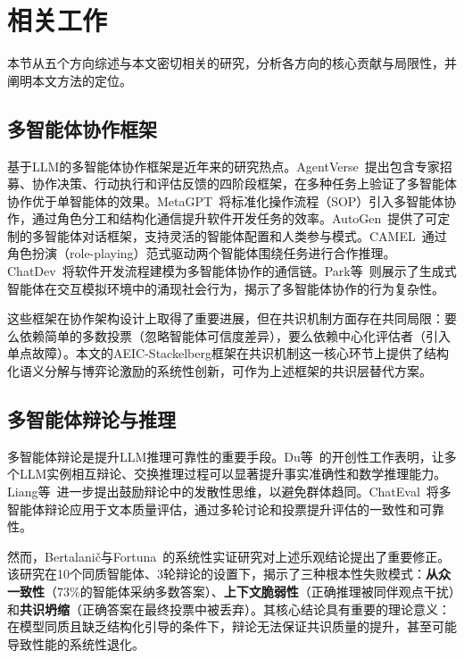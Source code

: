 \documentclass[12pt,a4paper,UTF8,fontset=fandol]{ctexart}
\begin{document}
\section{相关工作}\label{sec:related}

本节从五个方向综述与本文密切相关的研究，分析各方向的核心贡献与局限性，并阐明本文方法的定位。

\subsection{多智能体协作框架}

基于LLM的多智能体协作框架是近年来的研究热点。AgentVerse~\cite{chen2023agentverse}提出包含专家招募、协作决策、行动执行和评估反馈的四阶段框架，在多种任务上验证了多智能体协作优于单智能体的效果。MetaGPT~\cite{hong2023metagpt}将标准化操作流程（SOP）引入多智能体协作，通过角色分工和结构化通信提升软件开发任务的效率。AutoGen~\cite{wu2023autogen}提供了可定制的多智能体对话框架，支持灵活的智能体配置和人类参与模式。CAMEL~\cite{li2023camel}通过角色扮演（role-playing）范式驱动两个智能体围绕任务进行合作推理。ChatDev~\cite{qian2023chatdev}将软件开发流程建模为多智能体协作的通信链。Park等~\cite{park2023generative}则展示了生成式智能体在交互模拟环境中的涌现社会行为，揭示了多智能体协作的行为复杂性。

这些框架在协作架构设计上取得了重要进展，但在共识机制方面存在共同局限：要么依赖简单的多数投票（忽略智能体可信度差异），要么依赖中心化评估者（引入单点故障）。本文的AEIC-Stackelberg框架在共识机制这一核心环节上提供了结构化语义分解与博弈论激励的系统性创新，可作为上述框架的共识层替代方案。

\subsection{多智能体辩论与推理}

多智能体辩论是提升LLM推理可靠性的重要手段。Du等~\cite{du2023improving}的开创性工作表明，让多个LLM实例相互辩论、交换推理过程可以显著提升事实准确性和数学推理能力。Liang等~\cite{liang2023encouraging}进一步提出鼓励辩论中的发散性思维，以避免群体趋同。ChatEval~\cite{chan2023chateval}将多智能体辩论应用于文本质量评估，通过多轮讨论和投票提升评估的一致性和可靠性。

然而，Bertalani\v{c}与Fortuna~\cite{bertalanic2026cost}的系统性实证研究对上述乐观结论提出了重要修正。该研究在10个同质智能体、3轮辩论的设置下，揭示了三种根本性失败模式：\textbf{从众一致性}（73\%的智能体采纳多数答案）、\textbf{上下文脆弱性}（正确推理被同伴观点干扰）和\textbf{共识坍缩}（正确答案在最终投票中被丢弃）。其核心结论具有重要的理论意义：在模型同质且缺乏结构化引导的条件下，辩论无法保证共识质量的提升，甚至可能导致性能的系统性退化。
\end{document}
